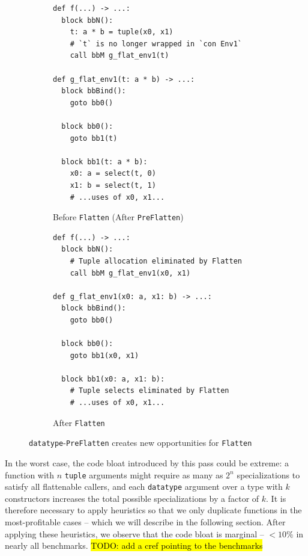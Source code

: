 \begin{figure}[htbp]
  \centering
  \begin{subfigure}[t]{0.48\textwidth}
    \caption{Before \texttt{Flatten} (After \texttt{PreFlatten})}
    \label{fig:simplify_enable_flatten_before}
    \vspace{1mm}
\begin{verbatim}
def f(...) -> ...:
  block bbN():
    t: a * b = tuple(x0, x1)
    # `t` is no longer wrapped in `con Env1`
    call bbM g_flat_env1(t)

def g_flat_env1(t: a * b) -> ...:
  block bbBind():
    goto bb0()

  block bb0():
    goto bb1(t)

  block bb1(t: a * b):
    x0: a = select(t, 0)
    x1: b = select(t, 1)
    # ...uses of x0, x1...
\end{verbatim}
  \end{subfigure}\hfill
  \begin{subfigure}[t]{0.48\textwidth}
    \caption{After \texttt{Flatten}}
    \label{fig:simplify_enable_flatten_after}
    \vspace{1mm}
\begin{verbatim}
def f(...) -> ...:
  block bbN():
    # Tuple allocation eliminated by Flatten
    call bbM g_flat_env1(x0, x1)

def g_flat_env1(x0: a, x1: b) -> ...:
  block bbBind():
    goto bb0()

  block bb0():
    goto bb1(x0, x1)

  block bb1(x0: a, x1: b):
    # Tuple selects eliminated by Flatten
    # ...uses of x0, x1...
\end{verbatim}
  \end{subfigure}
  \caption{\texttt{datatype}-\texttt{PreFlatten} creates new opportunities for \texttt{Flatten}}
  \label{fig:simplify_enable_flatten}
\end{figure}

In the worst case, the code bloat introduced by this pass could be extreme: a
function with $n$ \texttt{tuple} arguments might require as many as $2^n$
specializations to satisfy all flattenable callers, and each \texttt{datatype}
argument over a type with $k$ constructors increases the total possible
specializations by a factor of $k$. It is therefore necessary to apply
heuristics so that we only duplicate functions in the most-profitable cases --
which we will describe in the following section. After applying these
heuristics, we observe that the code bloat is marginal -- $< 10\%$ in nearly all
benchmarks. \hl{TODO: add a cref pointing to the benchmarks}

